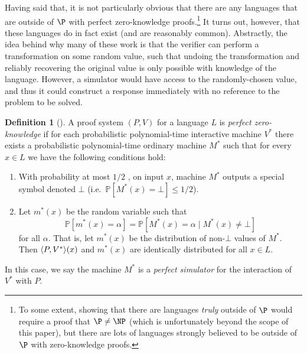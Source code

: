 \documentclass[english,12pt]{reedthesis}
\theoremstyle{plain}
\theoremstyle{definition}
\newtheorem{defn}[defn]{Definition}
\theoremstyle{remark}
\DeclarePairedDelimiter{\ang}{\langle}{\rangle}
\begin{document}
Having said that, it is not particularly obvious that there are any languages
that are outside of $\P$ with perfect zero-knowledge proofs.\footnote{To some
  extent, showing that there are languages \emph{truly} outside of $\P$ would
  require a proof that $\P \ne \NP$ (which is unfortunately beyond the scope of
  this paper), but there are lots of languages strongly believed to be outside
  of $\P$ with zero-knowledge proofs.} It turns out, however, that these
languages do in fact exist (and are reasonably common). Abstractly, the idea
behind why many of these work is that the verifier can perform a transformation
on some random value, such that undoing the transformation and reliably
recovering the original value is only possible with knowledge of the language.
However, a simulator would have access to the randomly-chosen value, and thus it
could construct a response immediately with no reference to the problem to be
solved.

\begin{defn}[{\cite[Def.\ 4.3.1]{Go01}}]\label{def:zero-knowledge}%
  A proof system $(P, V)$ for a language $L$ is \emph{perfect zero-knowledge} if
  for each probabilistic polynomial-time interactive machine $V^{*}$ there
  exists a probabilistic polynomial-time ordinary machine $M^{*}$ such that for
  every $x \in L$ we have the following conditions hold:
  \begin{enumerate}
    \item With probability at most $1/2$ , on input $x$, machine $M^{*}$ outputs
          a special symbol denoted $\bot$ (i.e.\ $\mathbb{P}[M^{*}(x) = \bot] \le 1/2$).
    \item Let $m^{*}(x)$ be the random variable such that
          \begin{equation}
            \mathbb{P}[m^{*}(x) = \alpha] = \mathbb{P}[M^{*}(x) = \alpha \mid M^{*}(x) \ne \bot]
          \end{equation}
          for all $\alpha$. That is, let $m^{*}(x)$ be the distribution of non-$\bot$
          values of $M^{*}$. Then $\ang{P, V^{*}}(x)$ and $m^{*}(x)$ are
          identically distributed for all $x \in L$.
  \end{enumerate}
  In this case, we say the machine $M^{*}$ is a \emph{perfect simulator} for the
  interaction of $V^{*}$ with $P$.
\end{defn}
\end{document}
